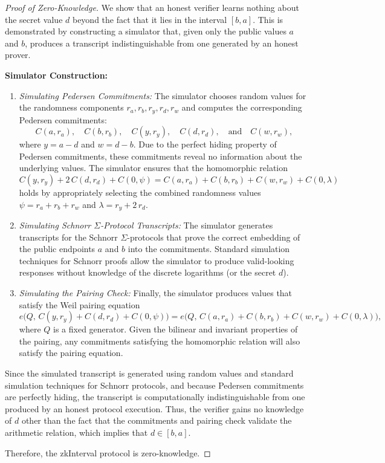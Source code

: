 \documentclass[version=preprint]{iacrcc}
\begin{document}
\begin{proof}[Proof of Zero-Knowledge]
  We show that an honest verifier learns nothing about the secret value \( d \) beyond the fact that it lies in the interval \([b, a]\). This is demonstrated by constructing a simulator that, given only the public values \(a\) and \(b\), produces a transcript indistinguishable from one generated by an honest prover.
  
  \textbf{Simulator Construction:}
  \begin{enumerate}
      \item \emph{Simulating Pedersen Commitments:}  
      The simulator chooses random values for the randomness components \(r_a, r_b, r_y, r_d, r_w\) and computes the corresponding Pedersen commitments:
      \[
      C(a, r_a), \quad C(b, r_b), \quad C(y, r_y), \quad C(d, r_d), \quad \text{and} \quad C(w, r_w),
      \]
      where \(y = a - d\) and \(w = d - b\). Due to the perfect hiding property of Pedersen commitments, these commitments reveal no information about the underlying values. The simulator ensures that the homomorphic relation
      \[
      C(y, r_y) + 2\,C(d, r_d) + C(0, \psi) = C(a, r_a) + C(b, r_b) + C(w, r_w) + C(0, \lambda)
      \]
      holds by appropriately selecting the combined randomness values \(\psi = r_a + r_b + r_w\) and \(\lambda = r_y + 2\,r_d\).
      
      \item \emph{Simulating Schnorr \(\Sigma\)-Protocol Transcripts:}  
      The simulator generates transcripts for the Schnorr \(\Sigma\)-protocols that prove the correct embedding of the public endpoints \(a\) and \(b\) into the commitments. Standard simulation techniques for Schnorr proofs allow the simulator to produce valid-looking responses without knowledge of the discrete logarithms (or the secret \(d\)).
      
      \item \emph{Simulating the Pairing Check:}  
      Finally, the simulator produces values that satisfy the Weil pairing equation
      \[
      e\Big(Q,\, C(y, r_y) + C(d, r_d) + C(0, \psi)\Big) = e\Big(Q,\, C(a, r_a) + C(b, r_b) + C(w, r_w) + C(0, \lambda)\Big),
      \]
      where \(Q\) is a fixed generator. Given the bilinear and invariant properties of the pairing, any commitments satisfying the homomorphic relation will also satisfy the pairing equation.
  \end{enumerate}
  
  Since the simulated transcript is generated using random values and standard simulation techniques for Schnorr protocols, and because Pedersen commitments are perfectly hiding, the transcript is computationally indistinguishable from one produced by an honest protocol execution. Thus, the verifier gains no knowledge of \( d \) other than the fact that the commitments and pairing check validate the arithmetic relation, which implies that \( d \in [b, a] \).
  
  Therefore, the zkInterval protocol is zero-knowledge.
\end{proof}
\end{document}
